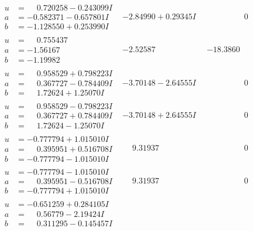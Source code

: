 \documentclass[1p]{elsarticle_modified}
\theoremstyle{definition}
\begin{document}
$$\begin{array}{c|c|c}
\begin{aligned}
u &= \phantom{-}0.720258 - 0.243099 I \\
a &= -0.582371 - 0.657801 I \\
b &= -1.128550 + 0.253990 I\end{aligned}
 & -2.84990 + 0.29345 I & \phantom{-0.000000 } 0 \\ \hline\begin{aligned}
u &= \phantom{-}0.755437\phantom{ +0.000000I} \\
a &= -1.56167\phantom{ +0.000000I} \\
b &= -1.19982\phantom{ +0.000000I}\end{aligned}
 & -2.52587\phantom{ +0.000000I} & -18.3860\phantom{ +0.000000I} \\ \hline\begin{aligned}
u &= \phantom{-}0.958529 + 0.798223 I \\
a &= \phantom{-}0.367727 - 0.784409 I \\
b &= \phantom{-}1.72624 + 1.25070 I\end{aligned}
 & -3.70148 - 2.64555 I & \phantom{-0.000000 } 0 \\ \hline\begin{aligned}
u &= \phantom{-}0.958529 - 0.798223 I \\
a &= \phantom{-}0.367727 + 0.784409 I \\
b &= \phantom{-}1.72624 - 1.25070 I\end{aligned}
 & -3.70148 + 2.64555 I & \phantom{-0.000000 } 0 \\ \hline\begin{aligned}
u &= -0.777794 + 1.015010 I \\
a &= \phantom{-}0.395951 + 0.516708 I \\
b &= -0.777794 - 1.015010 I\end{aligned}
 & \phantom{-}9.31937\phantom{ +0.000000I} & \phantom{-0.000000 } 0 \\ \hline\begin{aligned}
u &= -0.777794 - 1.015010 I \\
a &= \phantom{-}0.395951 - 0.516708 I \\
b &= -0.777794 + 1.015010 I\end{aligned}
 & \phantom{-}9.31937\phantom{ +0.000000I} & \phantom{-0.000000 } 0 \\ \hline\begin{aligned}
u &= -0.651259 + 0.284105 I \\
a &= \phantom{-}0.56779 - 2.19424 I \\
b &= \phantom{-}0.311295 - 0.145457 I\end{aligned}

\end{array}$$
\end{document}
